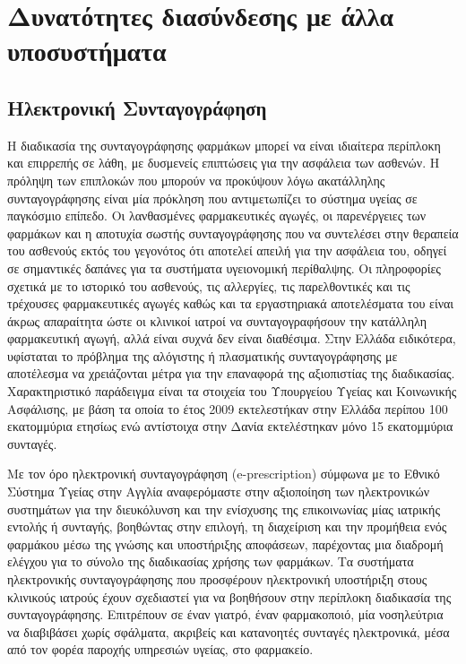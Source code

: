 		
\section{Δυνατότητες διασύνδεσης με άλλα υποσυστήματα}

	\subsection{Ηλεκτρονική Συνταγογράφηση}
	
		Η διαδικασία της συνταγογράφησης φαρμάκων μπορεί να είναι ιδιαίτερα περίπλοκη και επιρρεπής σε λάθη, με
δυσμενείς επιπτώσεις για την ασφάλεια των ασθενών. Η πρόληψη των επιπλοκών που μπορούν να προκύψουν λόγω ακατάλληλης συνταγογράφησης είναι μία πρόκληση που αντιμετωπίζει το σύστημα υγείας σε παγκόσμιο επίπεδο. Οι λανθασμένες φαρμακευτικές αγωγές, οι παρενέργειες των φαρμάκων και η αποτυχία σωστής συνταγογράφησης που να συντελέσει στην θεραπεία του ασθενούς εκτός του γεγονότος ότι αποτελεί απειλή για την ασφάλεια του, οδηγεί σε σημαντικές δαπάνες για τα συστήματα υγειονομική περίθαλψης. Οι πληροφορίες σχετικά με το ιστορικό του ασθενούς, τις αλλεργίες, τις παρελθοντικές και τις τρέχουσες φαρμακευτικές αγωγές καθώς και τα εργαστηριακά αποτελέσματα του είναι άκρως απαραίτητα ώστε οι κλινικοί ιατροί να συνταγογραφήσουν την κατάλληλη φαρμακευτική αγωγή, αλλά είναι συχνά δεν είναι διαθέσιμα. \cite{prescribingErrors} Στην Ελλάδα ειδικότερα, υφίσταται το πρόβλημα της αλόγιστης ή πλασματικής συνταγογράφησης με αποτέλεσμα να  χρειάζονται μέτρα για την επαναφορά της αξιοπιστίας της διαδικασίας.  Χαρακτηριστικό παράδειγμα είναι τα στοιχεία του Υπουργείου Υγείας και Κοινωνικής Ασφάλισης, με βάση τα οποία το έτος 2009 εκτελεστήκαν στην Ελλάδα περίπου 100 εκατομμύρια ετησίως ενώ αντίστοιχα στην Δανία εκτελέστηκαν μόνο 15 εκατομμύρια συνταγές.


		Με τον όρο ηλεκτρονική συνταγογράφηση (e-prescription) σύμφωνα με το Εθνικό Σύστημα Υγείας στην Αγγλία αναφερόμαστε στην αξιοποίηση των ηλεκτρονικών συστημάτων για την διευκόλυνση και την ενίσχυσης της επικοινωνίας μίας ιατρικής εντολής ή συνταγής, βοηθώντας στην επιλογή, τη διαχείριση και την προμήθεια ενός φαρμάκου μέσω της γνώσης και υποστήριξης αποφάσεων, παρέχοντας μια διαδρομή ελέγχου για το σύνολο της διαδικασίας χρήσης των φαρμάκων.  Τα συστήματα ηλεκτρονικής συνταγογράφησης που προσφέρουν ηλεκτρονική υποστήριξη στους κλινικούς ιατρούς έχουν σχεδιαστεί για να βοηθήσουν στην περίπλοκη διαδικασία της συνταγογράφησης. \cite{Kierkegaard2013} Επιτρέπουν σε έναν γιατρό, έναν φαρμακοποιό, μία νοσηλεύτρια να διαβιβάσει χωρίς σφάλματα, ακριβείς και κατανοητές συνταγές ηλεκτρονικά, μέσα από τον φορέα παροχής υπηρεσιών υγείας, στο φαρμακείο.  \cite{eprescr}
		
